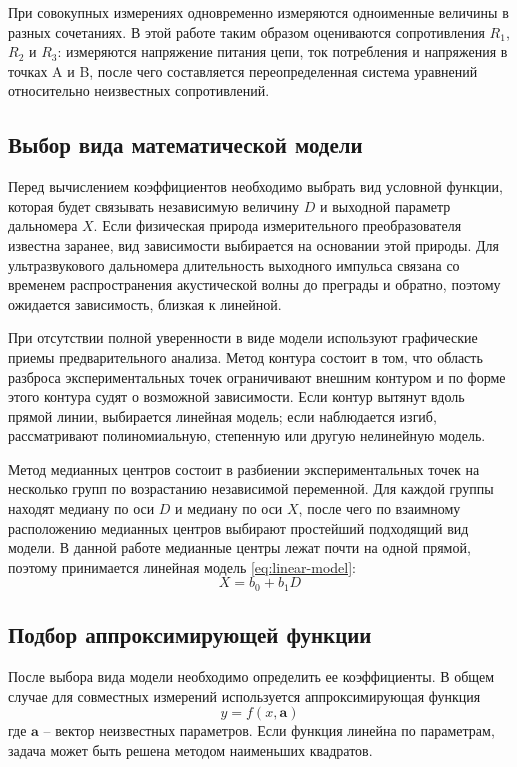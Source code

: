 \documentclass[12pt,a4paper]{article}
\begin{document}
При совокупных измерениях одновременно измеряются одноименные
величины в разных сочетаниях. В этой работе таким образом оцениваются
сопротивления $R_1$, $R_2$ и $R_3$: измеряются напряжение питания цепи,
ток потребления и напряжения в точках A и B, после чего составляется
переопределенная система уравнений относительно неизвестных сопротивлений.

\subsection{Выбор вида математической модели}

Перед вычислением коэффициентов необходимо выбрать вид условной функции,
которая будет связывать независимую величину $D$ и выходной параметр
дальномера $X$. Если физическая природа измерительного преобразователя
известна заранее, вид зависимости выбирается на основании этой природы.
Для ультразвукового дальномера длительность выходного импульса связана
со временем распространения акустической волны до преграды и обратно,
поэтому ожидается зависимость, близкая к линейной.

При отсутствии полной уверенности в виде модели используют графические
приемы предварительного анализа. Метод контура состоит в том, что область
разброса экспериментальных точек ограничивают внешним контуром и по форме
этого контура судят о возможной зависимости. Если контур вытянут вдоль
прямой линии, выбирается линейная модель; если наблюдается изгиб, рассматривают
полиномиальную, степенную или другую нелинейную модель.

Метод медианных центров состоит в разбиении экспериментальных точек на
несколько групп по возрастанию независимой переменной. Для каждой группы
находят медиану по оси $D$ и медиану по оси $X$, после чего по взаимному
расположению медианных центров выбирают простейший подходящий вид модели.
В данной работе медианные центры лежат почти на одной прямой, поэтому
принимается линейная модель \eqref{eq:linear-model}:
\begin{equation}
X = b_0 + b_1D
\tag{2}
\label{eq:linear-model}
\end{equation}

\subsection{Подбор аппроксимирующей функции}

После выбора вида модели необходимо определить ее коэффициенты.
В общем случае для совместных измерений используется аппроксимирующая
функция
\begin{equation*}
y = f(x, \mathbf{a})
\end{equation*}
где $\mathbf{a}$ – вектор неизвестных параметров. Если функция линейна по
параметрам, задача может быть решена методом наименьших квадратов.
\end{document}
